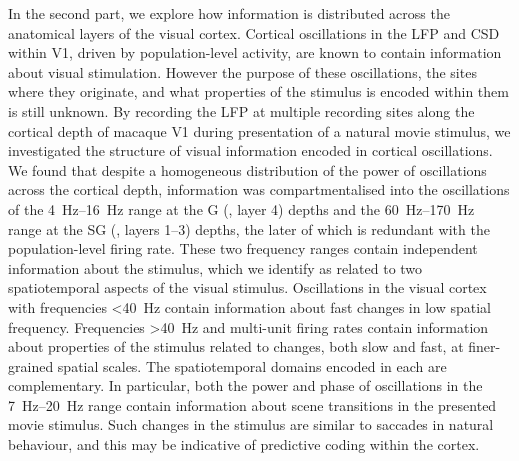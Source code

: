 In the second part, we explore how information is distributed across the anatomical layers of the visual cortex.
Cortical oscillations in the \acf{LFP} and \acf{CSD} within \acs{V1}, driven by population-level activity, are known to contain information about visual stimulation.
However the purpose of these oscillations, the sites where they originate, and what properties of the stimulus is encoded within them is still unknown.
By recording the \ac{LFP} at multiple recording sites along the cortical depth of macaque \acs{V1} during presentation of a natural movie stimulus, we investigated the structure of visual information encoded in cortical oscillations.
We found that despite a homogeneous distribution of the power of oscillations across the cortical depth, information was compartmentalised into the oscillations of the \SIrange{4}{16}{Hz} range at the \acl{G} (, layer 4) depths and the \SIrange{60}{170}{Hz} range at the \acl{SG} (, layers 1--3) depths, the later of which is redundant with the population-level firing rate.
These two frequency ranges contain independent information about the stimulus, which we identify as related to two spatiotemporal aspects of the visual stimulus.
Oscillations in the visual cortex with frequencies \SI{<40}{Hz} contain information about fast changes in low spatial frequency.
Frequencies \SI{>40}{Hz} and multi-unit firing rates contain information about properties of the stimulus related to changes, both slow and fast, at finer-grained spatial scales.
The spatiotemporal domains encoded in each are complementary.
In particular, both the power and phase of oscillations in the \SIrange{7}{20}{Hz} range contain information about scene transitions in the presented movie stimulus.
Such changes in the stimulus are similar to saccades in natural behaviour, and this may be indicative of predictive coding within the cortex.


\endgroup			

\vfill

